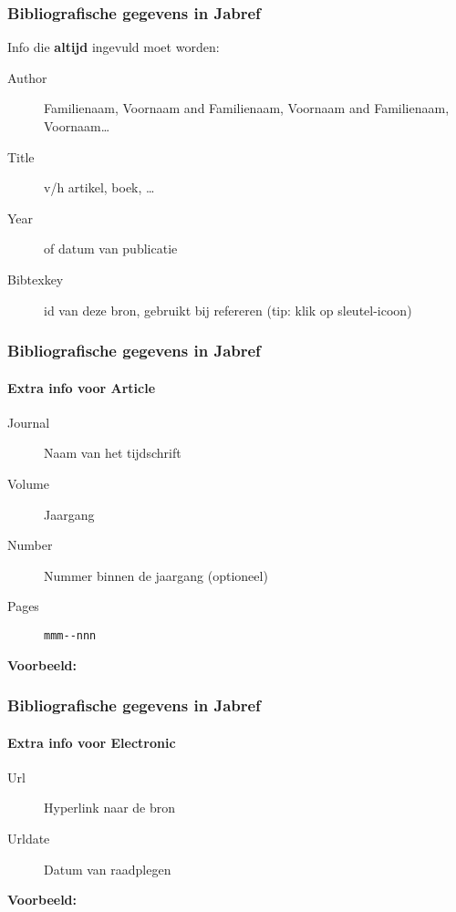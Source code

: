 \documentclass[aspectratio=169]{beamer}
\begin{document}
\begin{frame}
  \frametitle{Bibliografische gegevens in Jabref}
  
  Info die \textbf{altijd} ingevuld moet worden:
  
  \begin{description}
    \item[Author] Familienaam, Voornaam and Familienaam, Voornaam and Familienaam, Voornaam\ldots
    \item[Title] v/h artikel, boek, \ldots
    \item[Year] of datum van publicatie
    \item[Bibtexkey] id van deze bron, gebruikt bij refereren (tip: klik op sleutel-icoon)
  \end{description}
\end{frame}

\begin{frame}[fragile]
  \frametitle{Bibliografische gegevens in Jabref}
  \framesubtitle{Extra info voor Article}
  
  \begin{description}
    \item[Journal] Naam van het tijdschrift
    \item[Volume] Jaargang
    \item[Number] Nummer binnen de jaargang (optioneel)
    \item[Pages] \verb|mmm--nnn|
  \end{description}

  \bigskip
  
  \textbf{Voorbeeld:}
  
  \bigskip
  
\end{frame}

\begin{frame}
  \frametitle{Bibliografische gegevens in Jabref}
  \framesubtitle{Extra info voor Electronic}
  
  \begin{description}
    \item[Url] Hyperlink naar de bron
    \item[Urldate] Datum van raadplegen
  \end{description}

  \bigskip

  \textbf{Voorbeeld:}

  \bigskip


\end{frame}
\end{document}
